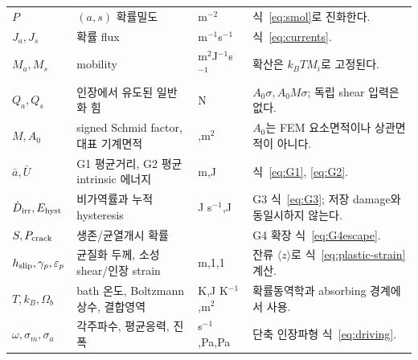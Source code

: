 \begin{longtable}{>{\raggedright\arraybackslash}p{}>{\raggedright\arraybackslash}p{}>{\raggedright\arraybackslash}p{}>{\raggedright\arraybackslash}p{}}
$P$ & $(a,s)$ 확률밀도 & m$^{-2}$ & 식~\eqref{eq:smol}로 진화한다.\\
$J_a,J_s$ & 확률 flux & m$^{-1}$s$^{-1}$ & 식~\eqref{eq:currents}.\\
$M_a,M_s$ & mobility & m$^2$J$^{-1}$s$^{-1}$ & 확산은 $k_BT M_i$로 고정된다.\\
$Q_a,Q_s$ & 인장에서 유도된 일반화 힘 & N & $A_0\sigma,A_0M\sigma$; 독립 shear 입력은 없다.\\
$M,A_0$ & signed Schmid factor, 대표 기계면적 & 1,m$^2$ & $A_0$는 FEM 요소면적이나 상관면적이 아니다.\\
$\bar a,\bar U$ & G1 평균거리, G2 평균 intrinsic 에너지 & m,J & 식~\eqref{eq:G1}, \eqref{eq:G2}.\\
$\dot D_{\rm irr},E_{\rm hyst}$ & 비가역률과 누적 hysteresis & J s$^{-1}$,J & G3 식~\eqref{eq:G3}; 저장 damage와 동일시하지 않는다.\\
$S,P_{\rm crack}$ & 생존/균열개시 확률 & 1 & G4 확장 식~\eqref{eq:G4escape}.\\
$h_{\rm slip},\gamma_p,\varepsilon_p$ & 균질화 두께, 소성 shear/인장 strain & m,1,1 & 잔류 $\langle z\rangle$로 식~\eqref{eq:plastic-strain} 계산.\\
$T,k_B,\Omega_b$ & bath 온도, Boltzmann 상수, 결합영역 & K,J K$^{-1}$,m$^2$ & 확률동역학과 absorbing 경계에서 사용.\\
$\omega,\sigma_m,\sigma_a$ & 각주파수, 평균응력, 진폭 & s$^{-1}$,Pa,Pa & 단축 인장파형 식~\eqref{eq:driving}.\\
\end{longtable}
\normalsize
